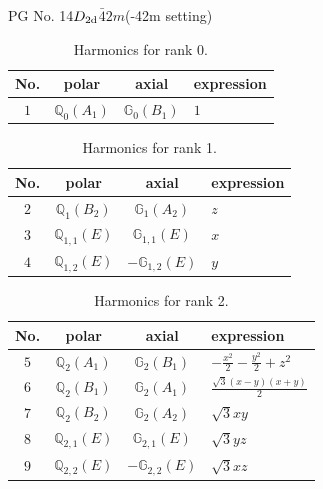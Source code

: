\documentclass[fleqn,8pt,landscape]{jsarticle}
\begin{document}
\setcounter{MaxMatrixCols}{32}

\renewcommand{\tablename}{Table~}
\renewcommand{\figurename}{Figure~}
\begin{center}
\LARGE
PG No. 14\quad$D_{\rm 2d}$\quad$\bar{4}2m$\quad(-42m setting)\quad[ tetragonal ]
\end{center}
\begin{table}[ht!]
\begin{center}
\caption{Harmonics for rank 0.}
\renewcommand{\arraystretch}{1.3}
\begin{tabular}{cccl} \hline \hline
No. & polar & axial & expression \\ \hline
$ 1 $ & $ \mathbb{Q}_{0}(A_{1}) $ & $ \mathbb{G}_{0}(B_{1}) $ & $ 1 $ \\
 \hline \hline
\end{tabular}
\end{center}
\end{table}
\begin{table}[ht!]
\begin{center}
\caption{Harmonics for rank 1.}
\renewcommand{\arraystretch}{1.3}
\begin{tabular}{cccl} \hline \hline
No. & polar & axial & expression \\ \hline
$ 2 $ & $ \mathbb{Q}_{1}(B_{2}) $ & $ \mathbb{G}_{1}(A_{2}) $ & $ z $ \\
$ 3 $ & $ \mathbb{Q}_{1,1}(E) $ & $ \mathbb{G}_{1,1}(E) $ & $ x $ \\
$ 4 $ & $ \mathbb{Q}_{1,2}(E) $ & $ -\mathbb{G}_{1,2}(E) $ & $ y $ \\
 \hline \hline
\end{tabular}
\end{center}
\end{table}
\begin{table}[ht!]
\begin{center}
\caption{Harmonics for rank 2.}
\renewcommand{\arraystretch}{1.3}
\begin{tabular}{cccl} \hline \hline
No. & polar & axial & expression \\ \hline
$ 5 $ & $ \mathbb{Q}_{2}(A_{1}) $ & $ \mathbb{G}_{2}(B_{1}) $ & $ - \frac{x^{2}}{2} - \frac{y^{2}}{2} + z^{2} $ \\
$ 6 $ & $ \mathbb{Q}_{2}(B_{1}) $ & $ \mathbb{G}_{2}(A_{1}) $ & $ \frac{\sqrt{3} \left(x - y\right) \left(x + y\right)}{2} $ \\
$ 7 $ & $ \mathbb{Q}_{2}(B_{2}) $ & $ \mathbb{G}_{2}(A_{2}) $ & $ \sqrt{3} x y $ \\
$ 8 $ & $ \mathbb{Q}_{2,1}(E) $ & $ \mathbb{G}_{2,1}(E) $ & $ \sqrt{3} y z $ \\
$ 9 $ & $ \mathbb{Q}_{2,2}(E) $ & $ -\mathbb{G}_{2,2}(E) $ & $ \sqrt{3} x z $ \\
 \hline \hline
\end{tabular}
\end{center}
\end{table}
\end{document}
